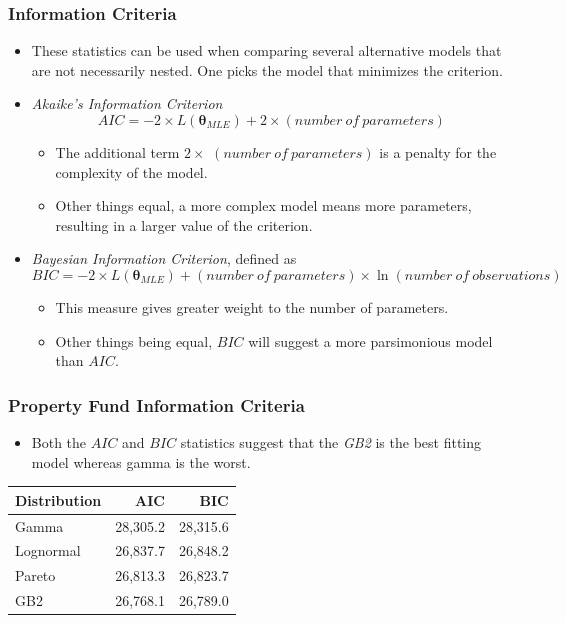 \documentclass{beamer}
\begin{document}
\begin{frame}[shrink=2]
\frametitle{Information Criteria}
\begin{itemize}
\item These statistics can be used when comparing several alternative models that are not necessarily nested. One picks the model that minimizes the criterion.
\item \emph{Akaike's Information Criterion}
\begin{equation*}
AIC = -2 \times L(\boldsymbol \theta_{MLE}) + 2 \times (number~of~parameters)
\end{equation*}
\begin{itemize}\item The additional term $2 \times $ $(number~of~parameters)$ is a penalty for the complexity of the model.
\item Other things equal, a more complex model means more parameters, resulting in a larger value of the criterion.
\end{itemize}
\item \emph{Bayesian Information Criterion}, defined as
\begin{equation*}
BIC = -2 \times L(\boldsymbol \theta_{MLE}) + (number~of~parameters) \times \ln (number~of~observations)
\end{equation*}
\begin{itemize}\item This measure gives greater weight to the number of parameters.
\item Other things being equal, $BIC$ will suggest a more parsimonious model than $AIC$.
\end{itemize}
\end{itemize}
\end{frame}

\begin{frame}[shrink=2]
\frametitle{Property Fund Information Criteria}
\begin{itemize}
\item Both the $AIC$ and $BIC$ statistics suggest that the \textit{GB2} is the best fitting model whereas gamma is the worst.
\end{itemize}
\begin{center}
\begin{tabular}{l|rr} \hline
Distribution &        AIC &        BIC \\ \hline
     Gamma &   28,305.2 &   28,315.6 \\
 Lognormal &   26,837.7 &   26,848.2 \\
    Pareto &   26,813.3 &   26,823.7 \\
       GB2 &   26,768.1 &   26,789.0 \\ \hline
\end{tabular}\end{center}
\end{frame}
\end{document}
